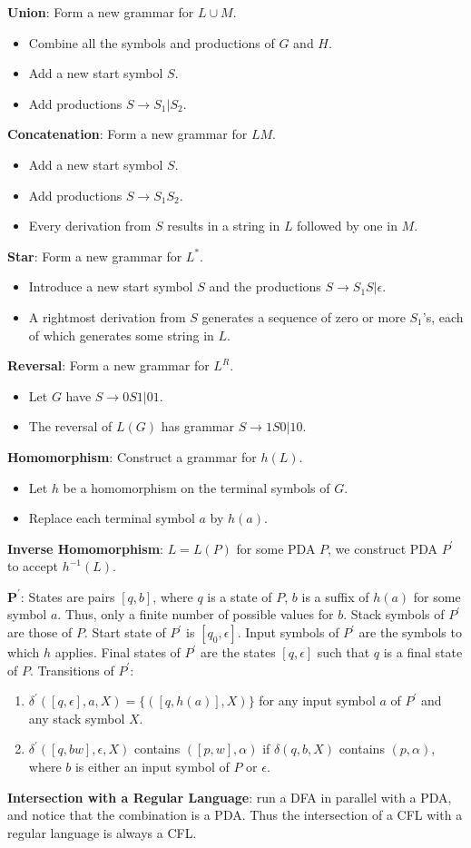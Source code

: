 \textbf{Union}: Form a new grammar for $L\cup M$.
\begin{itemize}
    \item Combine all the symbols and productions of $G$ and $H$. 
    \item Add a new start symbol $S$. 
    \item Add productions $S \rightarrow S_1 | S_2 $.
\end{itemize}
\textbf{Concatenation}: Form a new grammar for $LM$.
\begin{itemize}
    \item Add a new start symbol $S$.
    \item Add productions $S \rightarrow S_1S_2$. 
    \item Every derivation from $S$ results in a string in $L$ followed by one in $M$.
\end{itemize}
\textbf{Star}: Form a new grammar for $L^*.$
\begin{itemize}
    \item Introduce a new start symbol $S$ and the productions $S \rightarrow S_1 S | \epsilon.$
    \item A rightmost derivation from $S$ generates a sequence of zero or more $S_1$’s, each of which generates some string in $L$.
\end{itemize}
\textbf{Reversal}: Form a new grammar for $L^R$.
\begin{itemize}
    \item Let $G$ have $S \rightarrow 0S1 | 01$.
\item The reversal of $L(G)$ has grammar $S\rightarrow 1S0 | 10.$
\end{itemize}
\textbf{Homomorphism}: Construct a grammar for $h(L)$.
\begin{itemize}
    \item Let $h$ be a homomorphism on the terminal symbols of $G$.
    \item  Replace each terminal symbol $a$ by $h(a)$.
\end{itemize}
\textbf{Inverse Homomorphism}:  $L = L(P)$ for some PDA $P$, we construct PDA $P^\prime$ to accept $h^{-1}(L)$.

$\mathbf{P^\prime}$: States are pairs $[q, b]$, where $q$ is a state of $P$, $b$ is a suffix of $h(a)$ for some symbol $a$. Thus, only a finite number of possible values
for $b$. Stack symbols of $P^\prime$ are those of $P$. Start state of $P^\prime$ is $[q_0 ,\epsilon ]$. Input symbols of $P^\prime$ are the symbols to which $h$ applies.
Final states of $P^\prime$ are the states $[q, \epsilon]$ such that $q$ is a final state of $P$.
Transitions of $P^\prime$: 
\begin{enumerate}
\item $\delta^\prime([q, \epsilon], a, X) = \{([q, h(a)], X)\}$ for
any input symbol $a$ of $P^\prime$ and any stack
symbol $X$.
\item $\delta^\prime ([q, bw], \epsilon, X)$ contains $([p, w], \alpha)$ if
$\delta (q, b, X)$ contains $(p, \alpha)$, where $b$ is
either an input symbol of $P$ or $\epsilon$. 
\end{enumerate}
\textbf{Intersection with a Regular Language}: run a DFA in parallel
with a PDA, and notice that the combination is a PDA. Thus the intersection of a CFL with a regular language is always a CFL.
